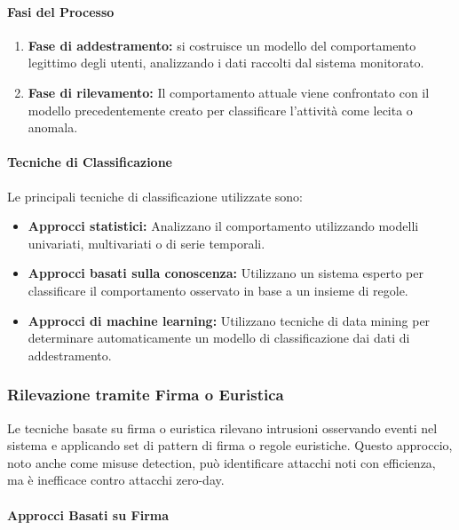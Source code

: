 \paragraph{Fasi del Processo}

\begin{enumerate}
    \item \textbf{Fase di addestramento:} si costruisce un modello del comportamento legittimo degli utenti, analizzando i dati raccolti dal sistema monitorato.
    \item \textbf{Fase di rilevamento:} Il comportamento attuale viene confrontato con il modello precedentemente creato per classificare l'attività come lecita o anomala.
\end{enumerate}

\paragraph{Tecniche di Classificazione}

Le principali tecniche di classificazione utilizzate sono:

\begin{itemize}
    \item \textbf{Approcci statistici:} Analizzano il comportamento utilizzando modelli univariati, multivariati o di serie temporali.
    \item \textbf{Approcci basati sulla conoscenza:} Utilizzano un sistema esperto per classificare il comportamento osservato in base a un insieme di regole.
    \item \textbf{Approcci di machine learning:} Utilizzano tecniche di data mining per determinare automaticamente un modello di classificazione dai dati di addestramento.
\end{itemize}

\subsubsection{Rilevazione tramite Firma o Euristica}

Le tecniche basate su firma o euristica rilevano intrusioni osservando eventi nel sistema e applicando set di pattern di firma o regole euristiche. Questo approccio, noto anche come misuse detection, può identificare attacchi noti con efficienza, ma è inefficace contro attacchi zero-day.

\paragraph{Approcci Basati su Firma}


